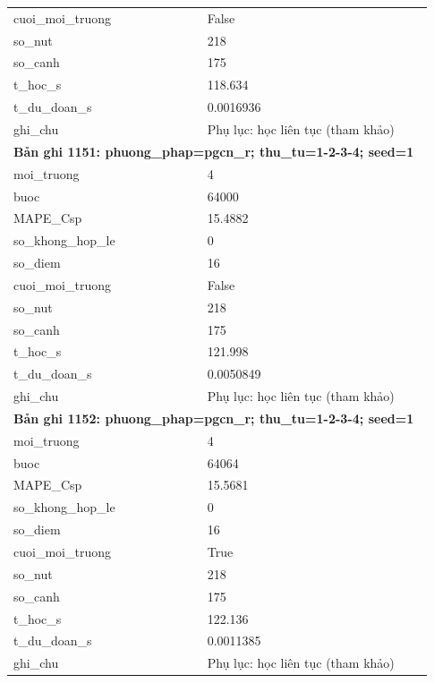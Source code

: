 \begin{longtable}{p{0.43\linewidth}p{0.50\linewidth}}
cuoi\_\allowbreak moi\_\allowbreak truong & False \\
so\_\allowbreak nut & 218 \\
so\_\allowbreak canh & 175 \\
t\_\allowbreak hoc\_\allowbreak s & 118.634 \\
t\_\allowbreak du\_\allowbreak doan\_\allowbreak s & 0.0016936 \\
ghi\_\allowbreak chu & Phụ lục: học liên tục (tham khảo) \\
\midrule
\multicolumn{2}{p{0.95\linewidth}}{\textbf{Bản ghi 1151: phuong\_phap=pgcn\_r; thu\_tu=1-2-3-4; seed=1}} \\
moi\_\allowbreak truong & 4 \\
buoc & 64000 \\
MAPE\_\allowbreak Csp & 15.4882 \\
so\_\allowbreak khong\_\allowbreak hop\_\allowbreak le & 0 \\
so\_\allowbreak diem & 16 \\
cuoi\_\allowbreak moi\_\allowbreak truong & False \\
so\_\allowbreak nut & 218 \\
so\_\allowbreak canh & 175 \\
t\_\allowbreak hoc\_\allowbreak s & 121.998 \\
t\_\allowbreak du\_\allowbreak doan\_\allowbreak s & 0.0050849 \\
ghi\_\allowbreak chu & Phụ lục: học liên tục (tham khảo) \\
\midrule
\multicolumn{2}{p{0.95\linewidth}}{\textbf{Bản ghi 1152: phuong\_phap=pgcn\_r; thu\_tu=1-2-3-4; seed=1}} \\
moi\_\allowbreak truong & 4 \\
buoc & 64064 \\
MAPE\_\allowbreak Csp & 15.5681 \\
so\_\allowbreak khong\_\allowbreak hop\_\allowbreak le & 0 \\
so\_\allowbreak diem & 16 \\
cuoi\_\allowbreak moi\_\allowbreak truong & True \\
so\_\allowbreak nut & 218 \\
so\_\allowbreak canh & 175 \\
t\_\allowbreak hoc\_\allowbreak s & 122.136 \\
t\_\allowbreak du\_\allowbreak doan\_\allowbreak s & 0.0011385 \\
ghi\_\allowbreak chu & Phụ lục: học liên tục (tham khảo) \\

\end{longtable}
